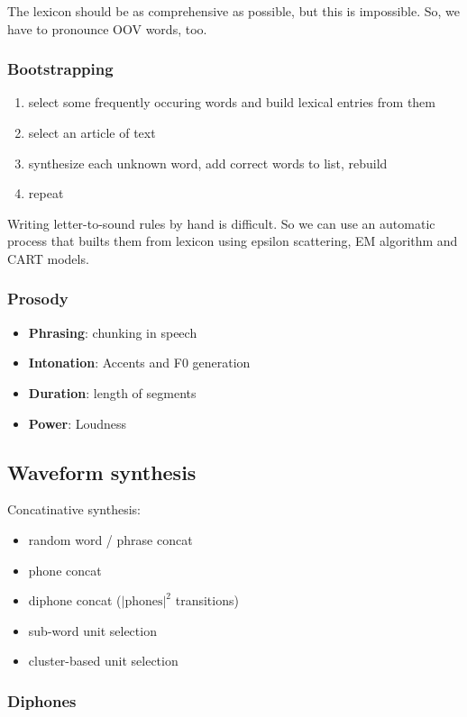 The lexicon should be as comprehensive as possible, but this is impossible. So, we have to pronounce OOV words, too.

\subsubsection{Bootstrapping}

\begin{enumerate}
    \item select some frequently occuring words and build lexical entries from them
    \item select an article of text
    \item synthesize each unknown word, add correct words to list, rebuild
    \item repeat
\end{enumerate}

Writing letter-to-sound rules by hand is difficult. So we can use an automatic process that builts them from lexicon using epsilon scattering, EM algorithm and CART models.

\subsubsection{Prosody}
\begin{itemize}
\item \textbf{Phrasing}: chunking in speech
\item \textbf{Intonation}: Accents and F0 generation
\item \textbf{Duration}: length of segments
\item \textbf{Power}: Loudness
\end{itemize}


\subsection{Waveform synthesis}
Concatinative synthesis:
\begin{itemize}
    \item random word / phrase concat
    \item phone concat
    \item diphone concat ($\left|\mbox{phones}\right|^2$ transitions)
    \item sub-word unit selection
    \item cluster-based unit selection
\end{itemize}

\subsubsection{Diphones}

